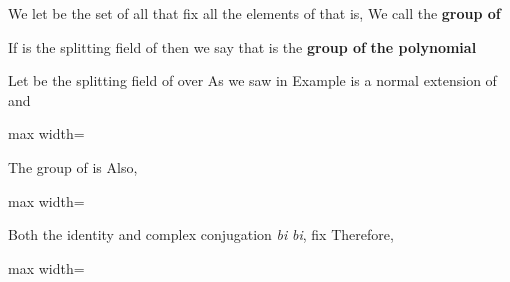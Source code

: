 \documentclass[11pt,oneside]{article}
\begin{document}
\begin{BookBody}

We let  be the set of all  that fix all the elements of  that is,  We call  the\textbf{ group of} 

If  is the splitting field of  then we say that  is the\textbf{ group of} \textbf{the polynomial} \BookEnd{\blacksquare}

 Let  be the splitting field of  over  As we saw in Example  is a normal extension of  and

\begin{center}\begin{adjustbox}{max width=\linewidth}\end{adjustbox}\end{center}

\noindent The group of  is  Also,

\begin{center}\begin{adjustbox}{max width=\linewidth}\end{adjustbox}\end{center}

Both the identity\BookInline{,\allowbreak \iota,\allowbreak } and complex conjugation \textit{bi} \textit{bi}, fix  Therefore,

\begin{center}\begin{adjustbox}{max width=\linewidth}\end{adjustbox}\end{center}


\end{BookBody}
\end{document}
